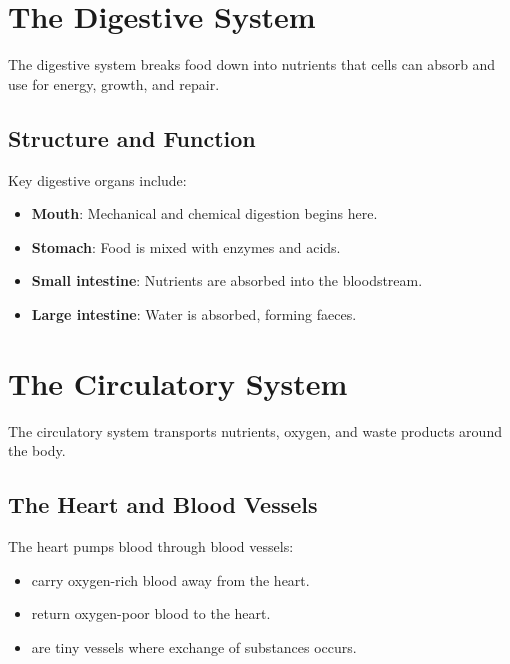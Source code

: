\section{The Digestive System}

The digestive system breaks food down into nutrients that cells can absorb and use for energy, growth, and repair.

\subsection{Structure and Function}

Key digestive organs include:

\begin{itemize}
    \item \textbf{Mouth}: Mechanical and chemical digestion begins here.
    \item \textbf{Stomach}: Food is mixed with enzymes and acids.
    \item \textbf{Small intestine}: Nutrients are absorbed into the bloodstream.
    \item \textbf{Large intestine}: Water is absorbed, forming faeces.
\end{itemize}


\section{The Circulatory System}

The circulatory system transports nutrients, oxygen, and waste products around the body.

\subsection{The Heart and Blood Vessels}

The heart pumps blood through blood vessels:

\begin{itemize}
    \item {} carry oxygen-rich blood away from the heart.
    \item {} return oxygen-poor blood to the heart.
    \item {} are tiny vessels where exchange of substances occurs.
\end{itemize}

